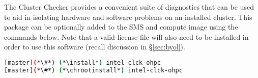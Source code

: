The \Intel{} Cluster Checker provides a convenient suite of diagnostics that
can be used to aid in isolating hardware and software problems on an installed
cluster. This package can be optionally added to the SMS and compute image
using the commands below. Note that a valid license file will also need to be
installed in order to use this software (recall discussion in \S\ref{sec:byol}).

\begin{lstlisting}[language=bash,keywords={}]
[master](*\#*) (*\install*) intel-clck-ohpc
[master](*\#*) (*\chrootinstall*) intel-clck-ohpc
\end{lstlisting}
